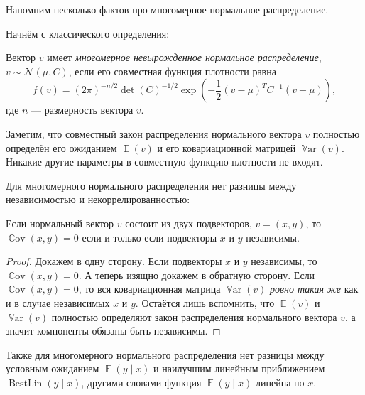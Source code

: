 \documentclass[12pt]{article}
\DeclareMathOperator{\Cov}{\mathbb{C}ov}
\DeclareMathOperator{\Var}{\mathbb{V}ar}
\DeclareMathOperator{\BestLin}{BestLin}
\DeclareMathOperator{\E}{\mathbb{E}}
\newcommand{\cN}{\mathcal{N}}
\begin{document}
Напомним несколько фактов про многомерное нормальное распределение.


Начнём с классического определения:
\begin{definition}
Вектор $v$ имеет \emph{многомерное невырожденное нормальное распределение}, $v \sim \cN(
\mu, C)$, если его совместная функция плотности равна 
\[
f(v) = (2\pi)^{-n/2} \det(C)^{-1/2} \exp\left(-\frac{1}{2}(v - \mu)^T C^{-1}(v-\mu)\right),
\]    
где $n$ — размерность вектора $v$.
\end{definition}

Заметим, что совместный закон распределения нормального вектора $v$ полностью определён его ожиданием $\E(v)$ и его ковариационной матрицей $\Var(v)$.
Никакие другие параметры в совместную функцию плотности не входят. 

Для многомерного нормального распределения нет разницы между независимостью и некоррелированностью:
\begin{theorem}
Если нормальный вектор $v$ состоит из двух подвекторов, $v = (x, y)$, то $\Cov(x, y) = 0$ если и только если подвекторы $x$ и $y$ независимы.     
\end{theorem}
\begin{proof}
    Докажем в одну сторону. 
    Если подвекторы $x$ и $y$ независимы, то $\Cov(x, y) = 0$.
    А теперь изящно докажем в обратную сторону. 
    Если $\Cov(x, y) = 0$, то вся ковариационная матрица $\Var(v)$ \emph{ровно такая же} как и в случае независимых $x$ и $y$. 
    Остаётся лишь вспомнить, что $\E(v)$ и $\Var(v)$ полностью определяют закон распределения нормального вектора $v$, а значит компоненты обязаны быть независимы. 
\end{proof}

Также для многомерного нормального распределения нет разницы между условным ожиданием $\E(y \mid x)$ и наилучшим линейным приближением $\BestLin(y \mid x)$, 
другими словами функция $\E(y \mid x)$ линейна по $x$.
\end{document}
